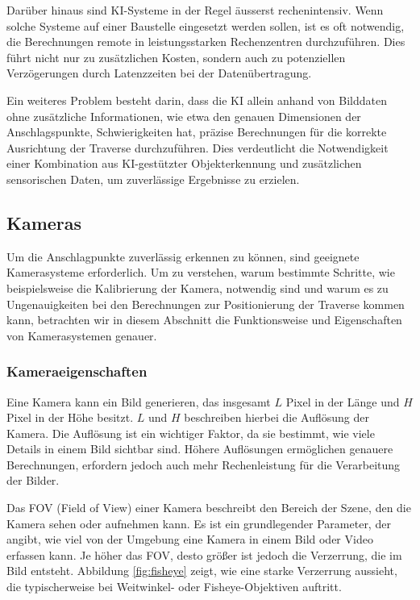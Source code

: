 Darüber hinaus sind KI-Systeme in der Regel äusserst rechenintensiv. Wenn solche Systeme auf
einer Baustelle eingesetzt werden sollen, ist es oft notwendig, die Berechnungen remote in 
leistungsstarken Rechenzentren durchzuführen. Dies führt nicht nur zu zusätzlichen Kosten, 
sondern auch zu potenziellen Verzögerungen durch Latenzzeiten bei der Datenübertragung.

Ein weiteres Problem besteht darin, dass die KI allein anhand von Bilddaten ohne zusätzliche 
Informationen, wie etwa den genauen Dimensionen der Anschlagspunkte, Schwierigkeiten hat, 
präzise Berechnungen für die korrekte Ausrichtung der Traverse durchzuführen.
Dies verdeutlicht die Notwendigkeit einer Kombination aus KI-gestützter Objekterkennung und 
zusätzlichen sensorischen Daten, um zuverlässige Ergebnisse zu erzielen.

\subsection{Kameras}
Um die Anschlagpunkte zuverlässig erkennen zu können, sind geeignete Kamerasysteme
erforderlich. Um zu verstehen, warum bestimmte Schritte, wie beispielsweise die 
Kalibrierung der Kamera, notwendig sind und warum es zu Ungenauigkeiten bei den 
Berechnungen zur Positionierung der Traverse kommen kann, betrachten wir in diesem 
Abschnitt die Funktionsweise und Eigenschaften von Kamerasystemen genauer.

\subsubsection{Kameraeigenschaften}
Eine Kamera kann ein Bild generieren, das insgesamt \( L \) Pixel in 
der Länge und \( H \) Pixel in der Höhe besitzt. \( L \) und \( H \) 
beschreiben hierbei die Auflösung der Kamera. Die Auflösung ist ein 
wichtiger Faktor, da sie bestimmt, wie viele Details in einem Bild 
sichtbar sind. Höhere Auflösungen ermöglichen genauere Berechnungen, 
erfordern jedoch auch mehr Rechenleistung für die Verarbeitung der 
Bilder.

Das FOV (Field of View) einer Kamera beschreibt den Bereich der Szene,
den die Kamera sehen oder aufnehmen kann. Es ist ein grundlegender 
Parameter, der angibt, wie viel von der Umgebung eine Kamera in einem 
Bild oder Video erfassen kann. Je höher das FOV, desto größer ist 
jedoch die Verzerrung, die im Bild entsteht.
Abbildung \ref{fig:fisheye} zeigt, wie eine starke Verzerrung aussieht,
die typischerweise bei Weitwinkel- oder Fisheye-Objektiven auftritt.

